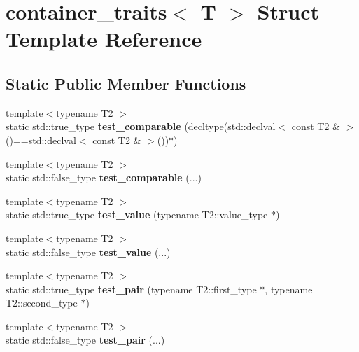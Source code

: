 \hypertarget{structcontainer__traits}{}\section{container\+\_\+traits$<$ T $>$ Struct Template Reference}
\label{structcontainer__traits}
\subsection*{Static Public Member Functions}
\begin{DoxyCompactItemize}
\item 
{\footnotesize template$<$typename T2 $>$ }\\static std\+::true\+\_\+type {\bfseries test\+\_\+comparable} (decltype(std\+::declval$<$ const T2 \& $>$()==std\+::declval$<$ const T2 \& $>$())$\ast$)\hypertarget{structcontainer__traits_af21ec0063852e1bec727c4503e31e316}{}\label{structcontainer__traits_af21ec0063852e1bec727c4503e31e316}

\item 
{\footnotesize template$<$typename T2 $>$ }\\static std\+::false\+\_\+type {\bfseries test\+\_\+comparable} (...)\hypertarget{structcontainer__traits_ac2cd8fecd9029ec8e2a4d14b04223d6d}{}\label{structcontainer__traits_ac2cd8fecd9029ec8e2a4d14b04223d6d}

\item 
{\footnotesize template$<$typename T2 $>$ }\\static std\+::true\+\_\+type {\bfseries test\+\_\+value} (typename T2\+::value\+\_\+type $\ast$)\hypertarget{structcontainer__traits_a00e1d17df72634112a0d82724df08e97}{}\label{structcontainer__traits_a00e1d17df72634112a0d82724df08e97}

\item 
{\footnotesize template$<$typename T2 $>$ }\\static std\+::false\+\_\+type {\bfseries test\+\_\+value} (...)\hypertarget{structcontainer__traits_a8ed5be321721d91c3d68ef269b848988}{}\label{structcontainer__traits_a8ed5be321721d91c3d68ef269b848988}

\item 
{\footnotesize template$<$typename T2 $>$ }\\static std\+::true\+\_\+type {\bfseries test\+\_\+pair} (typename T2\+::first\+\_\+type $\ast$, typename T2\+::second\+\_\+type $\ast$)\hypertarget{structcontainer__traits_a29ea1a081953a79394605cc9ca7a3694}{}\label{structcontainer__traits_a29ea1a081953a79394605cc9ca7a3694}

\item 
{\footnotesize template$<$typename T2 $>$ }\\static std\+::false\+\_\+type {\bfseries test\+\_\+pair} (...)\hypertarget{structcontainer__traits_afbc50d3448c347e73f94cfe1a8d1b2b8}{}\label{structcontainer__traits_afbc50d3448c347e73f94cfe1a8d1b2b8}

\end{DoxyCompactItemize}
